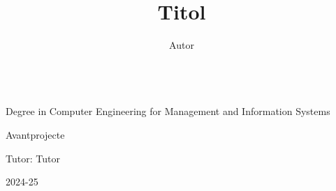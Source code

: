 \documentclass[12pt, twoside]{article}
\title{Titol}
\author{Autor}
\begin{document}
\thispagestyle{empty}
\begin{center}
\\

\vspace{2cm}
\large{Degree in Computer Engineering for Management and Information Systems}

\par
\vspace{4cm}

\huge{\thetitle}

\vspace{3cm}
\huge{Avantprojecte}

\end{center}

\vspace{3.5cm}
\begin{flushright}
    
\large{\theauthor}

\large{Tutor: Tutor}

\large{2024-25}

\end{flushright}

\begin{center}

\\

\end{center}

\newpage


\end{document}
